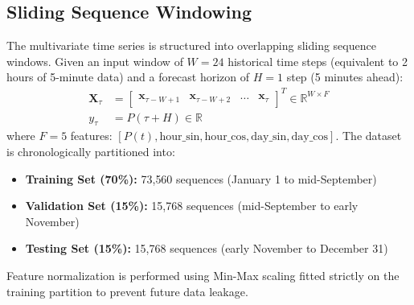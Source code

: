 \documentclass[conference]{IEEEtran}
\begin{document}
\subsection{Sliding Sequence Windowing}
The multivariate time series is structured into overlapping sliding sequence windows. Given an input window of $W=24$ historical time steps (equivalent to 2 hours of 5-minute data) and a forecast horizon of $H=1$ step (5 minutes ahead):
\begin{align}
\mathbf{X}_\tau &= \begin{bmatrix} \mathbf{x}_{\tau-W+1} & \mathbf{x}_{\tau-W+2} & \dots & \mathbf{x}_\tau \end{bmatrix}^T \in \mathbb{R}^{W \times F} \\
y_\tau &= P(\tau + H) \in \mathbb{R}
\end{align}
where $F=5$ features: $[P(t), \text{hour\_sin}, \text{hour\_cos}, \text{day\_sin}, \text{day\_cos}]$. The dataset is chronologically partitioned into:
\begin{itemize}
    \item \textbf{Training Set (70\%):} 73{,}560 sequences (January 1 to mid-September)
    \item \textbf{Validation Set (15\%):} 15{,}768 sequences (mid-September to early November)
    \item \textbf{Testing Set (15\%):} 15{,}768 sequences (early November to December 31)
\end{itemize}
Feature normalization is performed using Min-Max scaling fitted strictly on the training partition to prevent future data leakage.
\end{document}
